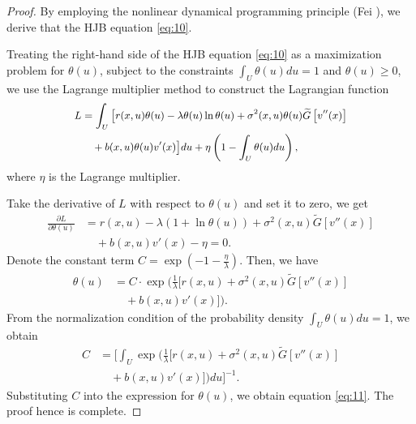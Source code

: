 \documentclass[onecolumn, journal]{IEEEtran} %
\begin{document}
	\begin{proof}
		By employing the nonlinear dynamical programming principle (Fei \cite{chen2021optimal}), we derive that
		the HJB equation \eqref{eq:10}.
		
		Treating the right-hand side of the HJB equation \eqref{eq:10} as a maximization problem for \( \theta(u) \), subject to the constraints \( \int_{U} \theta(u) d u=1 \) and \( \theta(u) \geq 0 \), we use the Lagrange multiplier method to construct the Lagrangian function
		\begin{equation*}
			\small
			\begin{split}
				L &= \int_{U} \big[ r(x, u) \theta(u) - \lambda \theta(u) \ln \theta(u) + \sigma^{2}(x, u) \theta(u) \widetilde{G}\left[v''(x)\right] \\
				&\quad+ b(x, u) \theta(u) v'(x) \big] du + \eta \left(1 - \int_{U} \theta(u) du\right),
			\end{split}
		\end{equation*}
		where \( \eta \) is the Lagrange multiplier.
		
		Take the derivative of \( L \) with respect to \( \theta(u) \) and set it to zero, we get
		\begin{equation*}
			\begin{split}
				\frac{\partial L}{\partial \theta(u)} &=  r(x, u) - \lambda (1 + \ln \theta(u)) + \sigma^{2}(x, u) \widetilde{G}\left[v''(x)\right] \\
				&\quad + b(x, u) v'(x) - \eta =0.
			\end{split}
		\end{equation*}
		Denote the constant term \( C = \exp\left(-1 - \frac{\eta}{\lambda}\right) \). Then, we have
		\begin{equation*}
			\begin{split}
				\theta(u) &= C \cdot \exp\bigg(\frac{1}{\lambda}\big[  r(x, u) + \sigma^{2}(x, u) \widetilde{G}\left[v''(x)\right] \\
				&\quad + b(x, u) v'(x)\big]\bigg).
			\end{split}
		\end{equation*}
		From the normalization condition of the probability density \( \int_{U} \theta(u) d u = 1 \), we obtain
		\begin{equation*}
			\begin{split}
				C &= \bigg[ \int_U \exp\bigg( \frac{1}{\lambda} \Big[  r(x,u) + \sigma^2(x,u)\widetilde{G}[v''(x)] \\
				&\quad + b(x,u)v'(x) \Big] \bigg) du \bigg]^{-1}.
			\end{split}
		\end{equation*}
		Substituting $C$ into the expression for \( \theta(u) \), we obtain equation \eqref{eq:11}. The proof hence is complete.
	\end{proof}
	
\end{document}
